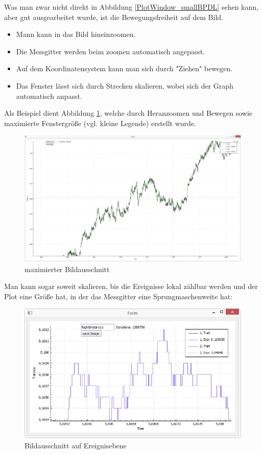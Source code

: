 \documentclass[11pt, a4paper, german]{article}
\theoremstyle{plain}
\begin{document}
	Was man zwar nicht direkt in Abbildung \ref{PlotWindow_smallBPDL} sehen kann, aber gut ausgearbeitet wurde, ist die Bewegungsfreiheit auf dem Bild.\\
	\begin{itemize}
		\item Mann kann in das Bild hineinzoomen.
		\item Die Messgitter werden beim zoomen automatisch angepasst.
		\item Auf dem Koordinatensystem kann man sich durch "{}Ziehen"{} bewegen.
		\item Das Fenster lässt sich durch Strecken skalieren, wobei sich der Graph automatisch anpasst.
	\end{itemize}
	Als Beispiel dient Abbildung \ref{PlotWindow_zoomedBPDLmaximized}, welche durch Heranzoomen und Bewegen sowie maximierte Fenstergröße (vgl. kleine Legende) erstellt wurde.
	\begin{figure}[H]
		\centering
		\includegraphics[width=0.9\linewidth]{./Pictures/PlotWindow_zoomedBPDLmaximized}
		\caption[PlotWindow]{maximierter Bildausschnitt}
		\label{PlotWindow_zoomedBPDLmaximized}
	\end{figure}
	Man kann sogar soweit skalieren, bis die Ereignisse lokal zählbar werden und der Plot eine Größe hat, in der das Messgitter eine Sprungmaschenweite hat:
	\begin{figure}[H]
		\centering
		\includegraphics[width=0.9\linewidth]{./Pictures/PlotWindow_zoomedBPDL_Stepview}
		\caption[PlotWindow]{Bildausschnitt auf Ereignisebene}
		\label{PlotWindow_zoomedBPDL_Stepview}
	\end{figure}	
	
\end{document}
